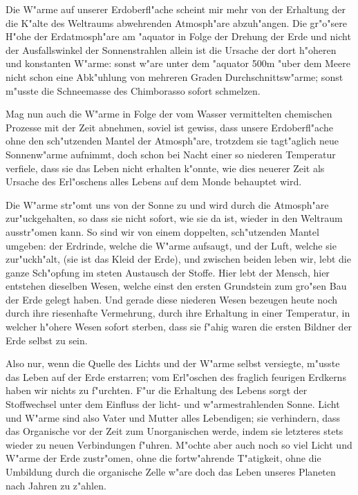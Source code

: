 \documentclass[a4paper, 11pt, oneside]{article}
\begin{document}
Die W"arme auf unserer Erdoberfl"ache scheint mir mehr von der Erhaltung der die K"alte des Weltraums abwehrenden Atmosph"are abzuh"angen. Die gr"o"sere H"ohe der Erdatmosph"are am "aquator in Folge der Drehung der Erde und nicht der Ausfallswinkel der Sonnenstrahlen allein ist die Ursache der dort h"oheren und konstanten W"arme: sonst w"are unter dem "aquator 500m "uber dem Meere nicht schon eine Abk"uhlung von mehreren Graden Durchschnittsw"arme; sonst m"usste die Schneemasse des Chimborasso sofort schmelzen.

Mag nun auch die W"arme in Folge der vom Wasser vermittelten chemischen Prozesse mit der Zeit abnehmen, soviel ist gewiss, dass unsere Erdoberfl"ache ohne den sch"utzenden Mantel der Atmosph"are, trotzdem sie tagt"aglich neue Sonnenw"arme aufnimmt, doch schon bei Nacht einer so niederen Temperatur verfiele, dass sie das Leben nicht erhalten k"onnte, wie dies neuerer Zeit als Ursache des Erl"oschens alles Lebens auf dem Monde behauptet wird.

Die W"arme str"omt uns von der Sonne zu und wird durch die Atmosph"are zur"uckgehalten, so dass sie nicht sofort, wie sie da ist, wieder in den Weltraum ausstr"omen kann. So sind wir von einem doppelten, sch"utzenden Mantel umgeben: der Erdrinde, welche die W"arme aufsaugt, und der Luft, welche sie zur"uckh"alt, (sie ist das Kleid der Erde), und zwischen beiden leben wir, lebt die ganze Sch"opfung im steten Austausch der Stoffe. Hier lebt der Mensch, hier entstehen dieselben Wesen, welche einst den ersten Grundstein zum gro"sen Bau der Erde gelegt haben. Und gerade diese niederen Wesen bezeugen heute noch durch ihre riesenhafte Vermehrung, durch ihre Erhaltung in einer Temperatur, in welcher h"ohere Wesen sofort sterben, dass sie f"ahig waren die ersten Bildner der Erde selbst zu sein.

Also nur, wenn die Quelle des Lichts und der W"arme selbst versiegte, m"usste das Leben auf der Erde erstarren; vom Erl"oschen des fraglich feurigen Erdkerns haben wir nichts zu f"urchten. F"ur die Erhaltung des Lebens sorgt der Stoffwechsel unter dem Einfluss der licht- und w"armestrahlenden Sonne. Licht und W"arme sind also Vater und Mutter alles Lebendigen; sie verhindern, dass das Organische vor der Zeit zum Unorganischen werde, indem sie letzteres stets wieder zu neuen Verbindungen f"uhren. M"ochte aber auch noch so viel Licht und W"arme der Erde zustr"omen, ohne die fortw"ahrende T"atigkeit, ohne die Umbildung durch die organische Zelle w"are doch das Leben unseres Planeten nach Jahren zu z"ahlen.
\end{document}
